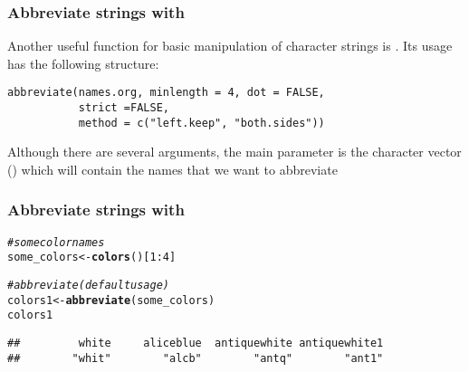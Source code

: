 \documentclass[12pt]{beamer}\usepackage[]{graphicx}\usepackage[]{color}
\makeatletter
\newcommand{\hlnum}[1]{\textcolor[rgb]{0.686,0.059,0.569}{#1}}%
\newcommand{\hlcom}[1]{\textcolor[rgb]{0.678,0.584,0.686}{\textit{#1}}}%
\newcommand{\hlopt}[1]{\textcolor[rgb]{0,0,0}{#1}}%
\newcommand{\hlstd}[1]{\textcolor[rgb]{0.345,0.345,0.345}{#1}}%
\newcommand{\hlkwb}[1]{\textcolor[rgb]{0.69,0.353,0.396}{#1}}%
\newcommand{\hlkwd}[1]{\textcolor[rgb]{0.737,0.353,0.396}{\textbf{#1}}}%
\newenvironment{kframe}{%
 \def\at@end@of@kframe{}%
 \ifinner\ifhmode%
  \def\at@end@of@kframe{\end{minipage}}%
  \begin{minipage}{\columnwidth}%
 \fi\fi%
 \def\FrameCommand##1{\hskip\@totalleftmargin \hskip-\fboxsep
 \colorbox{shadecolor}{##1}\hskip-\fboxsep
     \hskip-\linewidth \hskip-\@totalleftmargin \hskip\columnwidth}%
 \MakeFramed {\advance\hsize-\width
   \@totalleftmargin\z@ \linewidth\hsize
   \@setminipage}}%
 {\par\unskip\endMakeFramed%
 \at@end@of@kframe}
\newenvironment{knitrout}{}{} %
\makeatother
\begin{document}

\begin{frame}[fragile]
\frametitle{Abbreviate strings with }

Another useful function for basic manipulation of character strings is . Its usage has the following structure:

\begin{verbatim}
abbreviate(names.org, minlength = 4, dot = FALSE, 
           strict =FALSE,
           method = c("left.keep", "both.sides"))
\end{verbatim}

Although there are several arguments, the main parameter is the character vector () which will contain the names that we want to abbreviate

\end{frame}


\begin{frame}[fragile]
\frametitle{Abbreviate strings with }

\begin{knitrout}\footnotesize
{}\color{fgcolor}\begin{kframe}
\begin{alltt}
\hlcom{# some color names}
\hlstd{some_colors} \hlkwb{<-} \hlkwd{colors}\hlstd{()[}\hlnum{1}\hlopt{:}\hlnum{4}\hlstd{]}

\hlcom{# abbreviate (default usage)}
\hlstd{colors1} \hlkwb{<-} \hlkwd{abbreviate}\hlstd{(some_colors)}
\hlstd{colors1}
\end{alltt}
\begin{verbatim}
##         white     aliceblue  antiquewhite antiquewhite1 
##        "whit"        "alcb"        "antq"        "ant1"
\end{verbatim}
\end{kframe}
\end{knitrout}

\end{frame}

\end{document}
